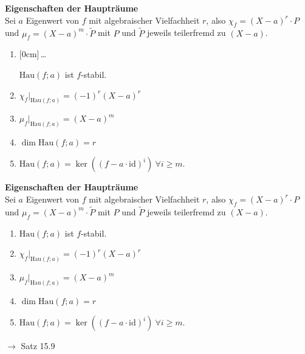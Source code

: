 \documentclass[11pt]{article}
\renewcommand{\cite}[1]{\par\bigskip\hfill{\color{gray}\tiny\(\to\) #1}}
\renewcommand{\geq}{\geqslant}
\newcommand{\id}{\mathrm{id}}
\newcommand{\hide}[1]{\parbox{0cm}{\raisebox{-7pt}[0cm]{\dots}}\color{white}#1\color{black}}
\let\olddots\dots
\renewcommand{\dots}{\,\olddots\,}
\newenvironment{field}{}{\newpage}
\newif\ifnote
\newenvironment{note}{\notetrue}{\notefalse}
\newcommand{\localtag}{}
\newcommand{\globaltag}{}
\newcommand{\uuid}{}
\newcommand{\tags}[1]{
    \ifnote
        \renewcommand{\localtag}{#1}
    \else
        \renewcommand{\globaltag}{#1}
    \fi
    }
\newcommand{\xplain}[1]{\renewcommand{\uuid}{#1}}
\begin{document}
\begin{note}
    \tags{Satz}
    \xplain{2351ff5a-204c-45bb-8b66-75d2238fbfb3}

    \begin{field}
        \textbf{Eigenschaften der Haupträume}\\
        Sei $a$ Eigenwert von $f$ mit algebraischer Vielfachheit $r$, also $\chi_f = (X-a)^r\cdot P$ und $\mu_f = (X-a)^m\cdot \tilde P$ mit $P$ und $\tilde P$ jeweils teilerfremd zu $(X-a)$.
        \begin{enumerate}[(1)]
            \item \hide{$\text{Hau}(f;a)$ ist $f$-stabil.}
            \item $\chi_f\vert_{\text{Hau}(f;a)} = (-1)^r(X-a)^r$
            \item $\mu_f\vert_{\text{Hau}(f;a)} = (X-a)^m$
            \item $\dim \text{Hau}(f;a) = r$
            \item $\text{Hau}(f;a)= \ker((f- a\cdot \id)^i) \ \forall i \geq m$.
        \end{enumerate}
    \end{field}
    \begin{field}
        \textbf{Eigenschaften der Haupträume}\\
        Sei $a$ Eigenwert von $f$ mit algebraischer Vielfachheit $r$, also $\chi_f = (X-a)^r\cdot P$ und $\mu_f = (X-a)^m\cdot \tilde P$ mit $P$ und $\tilde P$ jeweils teilerfremd zu $(X-a)$.
        \begin{enumerate}[(1)]
            \item $\text{Hau}(f;a)$ ist $f$-stabil.
            \item $\chi_f\vert_{\text{Hau}(f;a)} = (-1)^r(X-a)^r$
            \item $\mu_f\vert_{\text{Hau}(f;a)} = (X-a)^m$
            \item $\dim \text{Hau}(f;a) = r$
            \item $\text{Hau}(f;a)= \ker((f- a\cdot \id)^i) \ \forall i \geq m$.
        \end{enumerate}
        \cite{Satz 15.9}
    \end{field}


\end{note}
\end{document}
